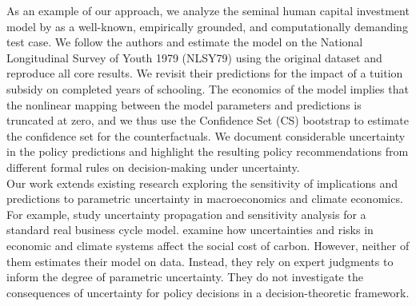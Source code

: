 \noindent As an example of our approach, we analyze the seminal human capital investment model by  \citet{Keane.1997} as a well-known, empirically grounded, and computationally demanding test case. We follow the authors and estimate the model on the National Longitudinal Survey of Youth 1979 (NLSY79) \citep{NLSY.2019} using the original dataset and reproduce all core results. We revisit their predictions for the impact of a tuition subsidy on completed years of schooling. The economics of the model implies that the nonlinear mapping between the model parameters and predictions is truncated at zero, and we thus use the Confidence Set (CS) bootstrap \citep{Woutersen.2019} to estimate the confidence set for the counterfactuals. We document considerable uncertainty in the policy predictions and highlight the resulting policy recommendations from different formal rules on decision-making under uncertainty.\\

\noindent Our work extends existing research exploring the sensitivity of implications and predictions to parametric uncertainty in macroeconomics and climate economics. For example, \citet{Harenberg.2019} study uncertainty propagation and sensitivity analysis for a standard real business cycle model. \citet{Cai.2019} examine how uncertainties and risks in economic and climate systems affect the social cost of carbon. However, neither of them estimates their model on data. Instead, they rely on expert judgments to inform the degree of parametric uncertainty. They do not investigate the consequences of uncertainty for policy decisions in a decision-theoretic framework.\\

